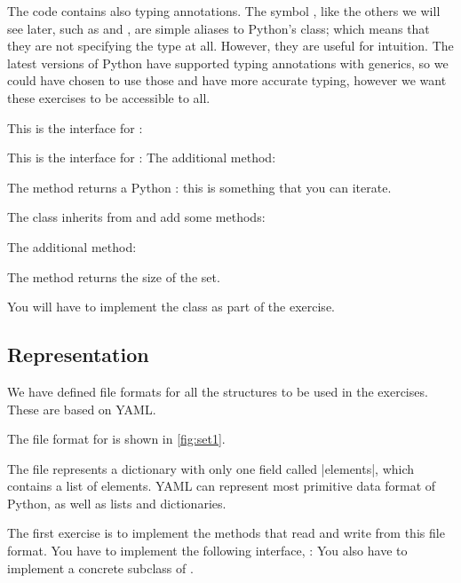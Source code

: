 The code contains also typing annotations.
The symbol , like the others we will see later, such as  and , are simple aliases to Python's  class; which means that they are not specifying the type at all.
However, they are useful for intuition.
The latest versions of Python have supported typing annotations with generics, so we could have chosen to use those and have more accurate typing, however we want these exercises to be accessible to all.


This is the interface for :


This is the interface for :
The additional method:
\begin{compactitem}
  \item The method  returns a Python : this is something that you can iterate.
\end{compactitem}



The class inherits from  and add some methods:

The additional method:
\begin{compactitem}
  \item The method  returns the size of the set.
\end{compactitem}

You will have to implement the  class as part of the exercise.


\subsection*{Representation}

We have defined file formats for all the structures to be used in the exercises.
These are based on YAML\@.


The file format for  is shown in \cref{fig:set1}.


The file represents a dictionary with only one field called \pystr|elements|, which contains a list of elements.
YAML can represent most primitive data format of Python, as well as lists and dictionaries.

\begin{gradedexercise}
  \label{ex:setrepr}
  The first exercise is to implement the methods that read and write from this file format.
  You have to implement the following interface, :
%
  You also have to implement a concrete subclass of .
\end{gradedexercise}

